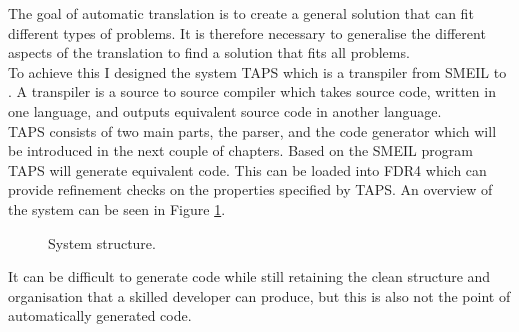 The goal of automatic translation is to create a general solution that can fit different types of problems. It is therefore necessary to generalise the different aspects of the translation to find a solution that fits all problems.\\
To achieve this I designed the system TAPS which is a transpiler from SMEIL to \cspm{}. A transpiler is a source to source compiler which takes source code, written in one language, and outputs equivalent source code in another language.\\

TAPS consists of two main parts, the parser, and the code generator which will be introduced in the next couple of chapters. Based on the SMEIL program TAPS will generate equivalent \cspm{} code. This can be loaded into FDR4 which can provide refinement checks on the properties specified by TAPS. An overview of the system can be seen in Figure \ref{fig:TAPS_network}.
\begin{figure}[!ht]
  \centering
  \caption{System structure.}
  \label{fig:TAPS_network}
\end{figure}

It can be difficult to generate code while still retaining the clean structure and organisation that a skilled developer can produce, but this is also not the point of automatically generated code. \\

